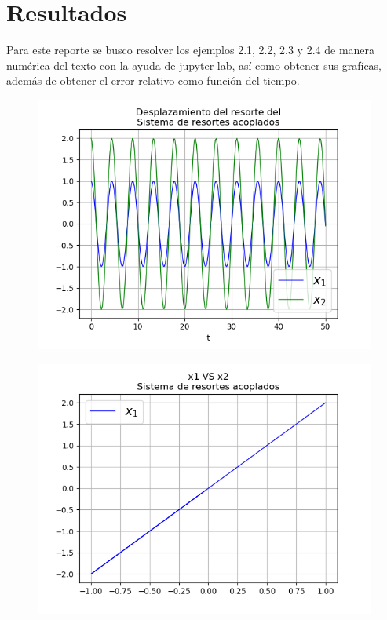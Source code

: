 \documentclass{article}
\begin{document}
\section{Resultados}
Para este reporte se busco resolver los ejemplos 2.1, 2.2, 2.3 y 2.4 de manera numérica del texto con la ayuda de jupyter lab, así como obtener sus grafícas, además de obtener el error relativo como función del tiempo.

\begin{figure}[h]
\centering
\includegraphics[scale=0.4]{r1.png}
\label{figure: Resortes acoplados }
\end{figure}


\begin{figure}[h]
\centering
\includegraphics[scale=0.4]{r2.png}
\label{figure: Resortes acoplados }
\end{figure}
\end{document}
